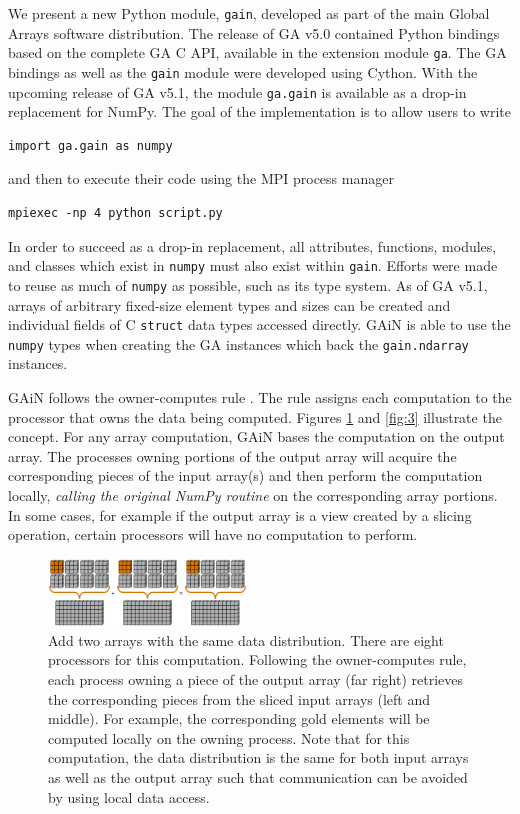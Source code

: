 \documentclass[preprint]{sigplanconf}
\begin{document}
We present a new Python module, \verb=gain=, developed as part of the main
Global Arrays software distribution. The release of GA v5.0 contained Python
bindings based on the complete GA C API, available in the extension module
\verb=ga=. The GA bindings as well as the \verb=gain= module were developed
using Cython. With the upcoming release of GA v5.1, the module \verb=ga.gain=
is available as a drop-in replacement for NumPy.  The goal of the
implementation is to allow users to write
\begin{verbatim}
import ga.gain as numpy
\end{verbatim}
and then to execute their code using the MPI process manager
\begin{verbatim}
mpiexec -np 4 python script.py
\end{verbatim}

In order to succeed as a drop-in replacement, all attributes, functions,
modules, and classes which exist in \verb=numpy= must also exist within
\verb=gain=.  Efforts were made to reuse as much of \verb=numpy= as possible,
such as its type system. As of GA v5.1, arrays of arbitrary fixed-size element
types and sizes can be created and individual fields of C \verb=struct= data
types accessed directly.  GAiN is able to use the \verb=numpy= types when
creating the GA instances which back the \verb=gain.ndarray= instances.

GAiN follows the owner-computes rule \cite{Zim88}. The rule assigns each
computation to the processor that owns the data being computed. Figures
\ref{fig:2} and \ref{fig:3} illustrate the concept. For any array computation,
GAiN bases the computation on the output array. The processes owning portions
of the output array will acquire the corresponding pieces of the input
array(s) and then perform the computation locally, \emph{calling the original
NumPy routine} on the corresponding array portions. In some cases, for example
if the output array is a view created by a slicing operation, certain
processors will have no computation to perform.

\begin{figure}[htb]
\centering
\includegraphics[width=0.47\textwidth]{image3_crop.eps}
\caption{
Add two arrays with the same data distribution. There are eight processors for
this computation.  Following the owner-computes rule, each process owning a
piece of the output array (far right) retrieves the corresponding pieces from
the sliced input arrays (left and middle). For example, the corresponding gold
elements will be computed locally on the owning process.  Note that for this
computation, the data distribution is the same for both input arrays as well
as the output array such that communication can be avoided by using local data
access.
}
\label{fig:2}
\end{figure}
\end{document}
